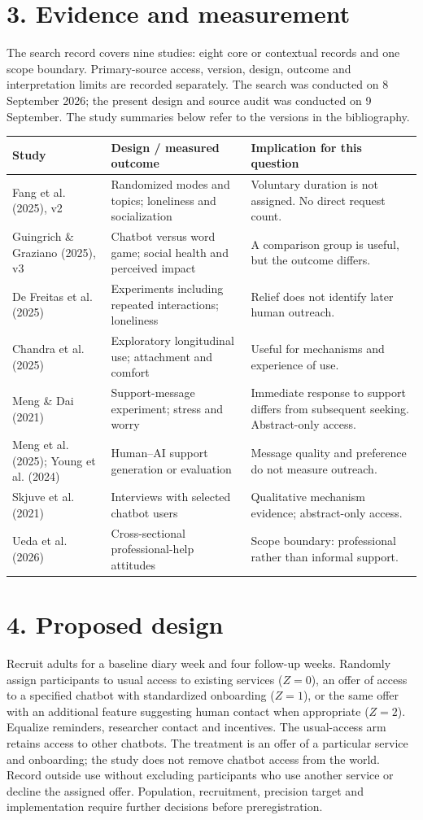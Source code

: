 \documentclass[11pt]{article}
\begin{document}
\section*{3. Evidence and measurement}
The search record covers nine studies: eight core or contextual records and one scope boundary. Primary-source access, version, design, outcome and interpretation limits are recorded separately. The search was conducted on 8 September 2026; the present design and source audit was conducted on 9 September. The study summaries below refer to the versions in the bibliography.
\small
\begin{tabularx}{\textwidth}{@{}p{}X X@{}}
\toprule
Study & Design / measured outcome & Implication for this question \\\midrule
Fang et al. (2025), v2 & Randomized modes and topics; loneliness and socialization & Voluntary duration is not assigned. No direct request count. \\\addlinespace
Guingrich \& Graziano (2025), v3 & Chatbot versus word game; social health and perceived impact & A comparison group is useful, but the outcome differs. \\\addlinespace
De Freitas et al. (2025) & Experiments including repeated interactions; loneliness & Relief does not identify later human outreach. \\\addlinespace
Chandra et al. (2025) & Exploratory longitudinal use; attachment and comfort & Useful for mechanisms and experience of use. \\\addlinespace
Meng \& Dai (2021) & Support-message experiment; stress and worry & Immediate response to support differs from subsequent seeking. Abstract-only access. \\\addlinespace
Meng et al. (2025); Young et al. (2024) & Human--AI support generation or evaluation & Message quality and preference do not measure outreach. \\\addlinespace
Skjuve et al. (2021) & Interviews with selected chatbot users & Qualitative mechanism evidence; abstract-only access. \\\addlinespace
Ueda et al. (2026) & Cross-sectional professional-help attitudes & Scope boundary: professional rather than informal support. \\\bottomrule
\end{tabularx}
\normalsize
\section*{4. Proposed design}
Recruit adults for a baseline diary week and four follow-up weeks. Randomly assign participants to usual access to existing services ($Z=0$), an offer of access to a specified chatbot with standardized onboarding ($Z=1$), or the same offer with an additional feature suggesting human contact when appropriate ($Z=2$). Equalize reminders, researcher contact and incentives.
The usual-access arm retains access to other chatbots. The treatment is an offer of a particular service and onboarding; the study does not remove chatbot access from the world. Record outside use without excluding participants who use another service or decline the assigned offer. Population, recruitment, precision target and implementation require further decisions before preregistration.
\newpage
\end{document}
